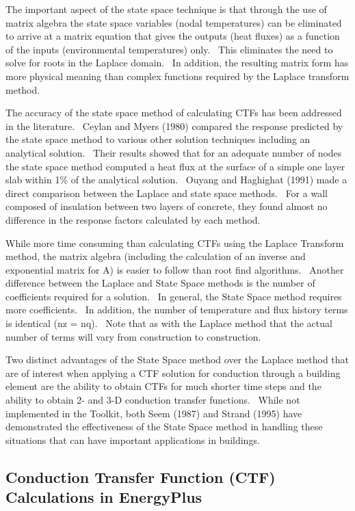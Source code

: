 The important aspect of the state space technique is that through the use of matrix algebra the state space variables (nodal temperatures) can be eliminated to arrive at a matrix equation that gives the outputs (heat fluxes) as a function of the inputs (environmental temperatures) only.~ This eliminates the need to solve for roots in the Laplace domain.~ In addition, the resulting matrix form has more physical meaning than complex functions required by the Laplace transform method.

The accuracy of the state space method of calculating CTFs has been addressed in the literature.~ Ceylan and Myers (1980) compared the response predicted by the state space method to various other solution techniques including an analytical solution.~ Their results showed that for an adequate number of nodes the state space method computed a heat flux at the surface of a simple one layer slab within 1\% of the analytical solution.~ Ouyang and Haghighat (1991) made a direct comparison between the Laplace and state space methods.~ For a wall composed of insulation between two layers of concrete, they found almost no difference in the response factors calculated by each method.

While more time consuming than calculating CTFs using the Laplace Transform method, the matrix algebra (including the calculation of an inverse and exponential matrix for A) is easier to follow than root find algorithms.~ Another difference between the Laplace and State Space methods is the number of coefficients required for a solution.~ In general, the State Space method requires more coefficients.~ In addition, the number of temperature and flux history terms is identical (nz = nq).~ Note that as with the Laplace method that the actual number of terms will vary from construction to construction.

Two distinct advantages of the State Space method over the Laplace method that are of interest when applying a CTF solution for conduction through a building element are the ability to obtain CTFs for much shorter time steps and the ability to obtain 2- and 3-D conduction transfer functions.~ While not implemented in the Toolkit, both Seem (1987) and Strand (1995) have demonstrated the effectiveness of the State Space method in handling these situations that can have important applications in buildings.

\subsection{Conduction Transfer Function (CTF) Calculations in EnergyPlus}\label{conduction-transfer-function-ctf-calculations-in-energyplus}

